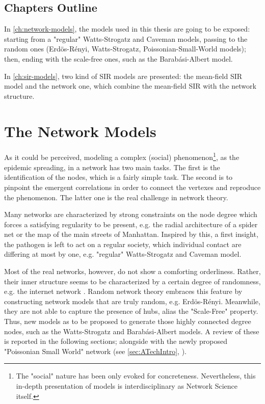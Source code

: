 \documentclass[a4paper,10pt,twoside]{book} %
\theoremstyle{definition}
\begin{document}
\section{Chapters Outline}
In \autoref{ch:network-models}, the models used in this thesis are going to be exposed: starting from a "regular" Watts-Strogatz and Caveman models, passing to the random ones (Erdös-Rényi, Watts-Strogatz, Poissonian-Small-World models); then, ending with the scale-free ones, such as the Barabási-Albert model. 

In \autoref{ch:sir-models}, two kind of SIR models are presented: the mean-field SIR model and the network one, which combine the mean-field SIR with the network structure.

\chapter{The Network Models}
\label{ch:network-models}
As it could be perceived, modeling a complex (social) phenomenon\footnote{The "social" nature has been only evoked for concreteness. Nevertheless, this in-depth presentation of models is interdisciplinary as Network Science itself.}, as the epidemic spreading, in a network has two main tasks. The first is the identification of the nodes, which is a fairly simple task. The second is to pinpoint the emergent correlations in order to connect the vertexes and reproduce the phenomenon. The latter one is the real challenge in network theory.

Many networks are characterized by strong constraints on the node degree which forces a satisfying regularity to be present, e.g. the radial architecture of a spider net or the map of the main streets of Manhattan.
Inspired by this, a first insight, the pathogen is left to act on a regular society, which individual contact are differing at most by one, e.g. "regular" Watts-Strogatz and Caveman model.

Most of the real networks, however, do not show a comforting orderliness. 
Rather, their inner structure seems to be characterized by a certain degree of randomness, e.g. the internet network \cite{barabasi::2016networkbook}. Random network theory embraces this feature by constructing network models that are truly random, e.g. Erdös-Rényi. Meanwhile, they are not able to capture the presence of hubs, alias the "Scale-Free" property. Thus, new models as to be proposed to generate those highly connected degree nodes, such as the Watts-Strogatz and Barabási-Albert models.
A review of these is reported in the following sections; alongside with the newly proposed "Poissonian Small World" network (see \autoref{sec:ATechIntro}, \cite{Thurner::NetBasedExpl}).
\end{document}
